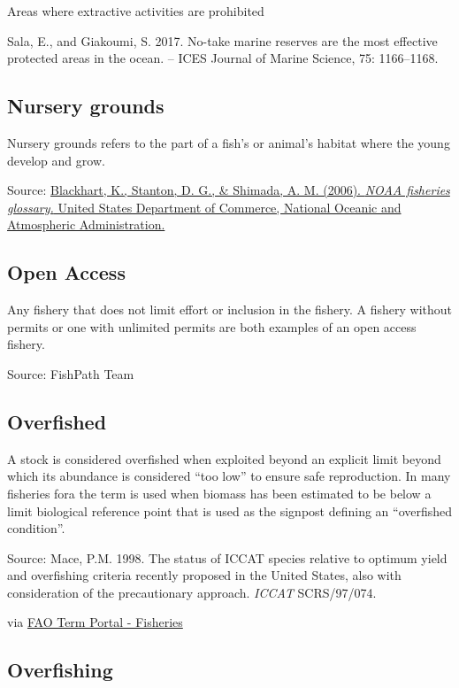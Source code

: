 \documentclass[
  11pt,
]{book}
\begin{document}
Areas where extractive activities are prohibited

Sala, E., and Giakoumi, S. 2017. No-take marine reserves are the most effective protected areas in the ocean. -- ICES Journal of Marine Science, 75: 1166--1168.

\hypertarget{nursery-grounds}{%
\subsection{Nursery grounds}\label{nursery-grounds}}

Nursery grounds refers to the part of a fish's or animal's habitat where the young develop and grow.

Source: \href{https://repository.library.noaa.gov/view/noaa/12856}{Blackhart, K., Stanton, D. G., \& Shimada, A. M. (2006). \emph{NOAA fisheries glossary.} United States Department of Commerce, National Oceanic and Atmospheric Administration.}

\hypertarget{open-access}{%
\subsection{Open Access}\label{open-access}}

Any fishery that does not limit effort or inclusion in the fishery. A fishery without permits or one with unlimited permits are both examples of an open access fishery.

Source: FishPath Team

\hypertarget{overfished}{%
\subsection{Overfished}\label{overfished}}

A stock is considered overfished when exploited beyond an explicit limit beyond which its abundance is considered ``too low'' to ensure safe reproduction. In many fisheries fora the term is used when biomass has been estimated to be below a limit biological reference point that is used as the signpost defining an ``overfished condition''.

Source: Mace, P.M. 1998. The status of ICCAT species relative to optimum yield and overfishing criteria recently proposed in the United States, also with consideration of the precautionary approach. \emph{ICCAT} SCRS/97/074.

via \href{http://www.fao.org/fishery/glossary/en}{FAO Term Portal - Fisheries}

\hypertarget{overfishing}{%
\subsection{Overfishing}\label{overfishing}}
\end{document}
